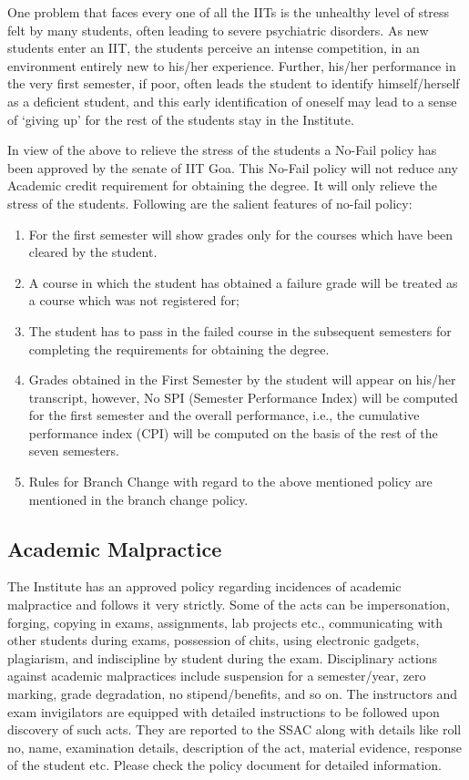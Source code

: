 One problem that faces every one of all the IITs is the unhealthy level of stress felt by many students, often leading to severe psychiatric disorders. As new students enter an IIT, the students perceive an intense competition, in an environment entirely new to his/her experience. Further, his/her performance in the very first semester, if poor, often leads the student to identify himself/herself as a deficient student, and this early identification of oneself may lead to a sense of ‘giving up’ for the rest of the students stay in the Institute.

In view of the above to relieve the stress of the students a No-Fail policy has been approved by the senate of IIT Goa. This No-Fail policy will not reduce any Academic credit requirement for obtaining the degree. It will only relieve the stress of the students. Following are the salient features of no-fail policy:

\begin{enumerate}
    \item For the first semester will show grades only for the courses which have been cleared by the student.
    \item A course in which the student has obtained a failure grade will be treated as a course which was not registered for;
    \item The student has to pass in the failed course in the subsequent semesters for completing the requirements for obtaining the degree.
    \item Grades obtained in the First Semester by the student will appear on his/her transcript, however, No SPI (Semester Performance Index) will be computed for the first semester and the overall performance, i.e., the cumulative performance index (CPI) will be computed on the basis of the rest of the seven semesters.
    \item Rules for Branch Change with regard to the above mentioned policy are mentioned in the branch change policy.
\end{enumerate}

\subsection{Academic Malpractice}

The Institute has an approved policy regarding incidences of academic malpractice and follows it very strictly. Some of the acts can be impersonation, forging, copying in exams, assignments, lab projects etc., communicating with other students during exams, possession of chits, using electronic gadgets, plagiarism, and indiscipline by student during the exam. Disciplinary actions against academic malpractices include suspension for a semester/year, zero marking, grade degradation, no stipend/benefits, and so on. The instructors and exam invigilators are equipped with detailed instructions to be followed upon discovery of such acts. They are reported to the SSAC along with details like roll no, name, examination details, description of the act, material evidence, response of the student etc. Please check the policy document for detailed information. 